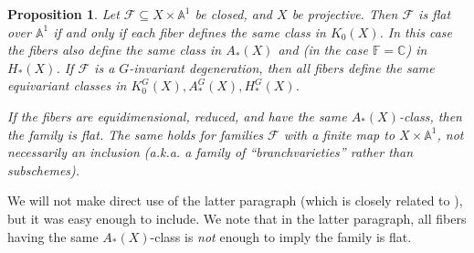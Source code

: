 \documentclass[10pt,a4paper]{amsart}
\newtheorem{proposition}[Thm]{Proposition}
\newcommand{\CC}{\mathbb{C}}
\def\AA{{\mathbb A }}
\newcommand\FF{{\mathbb F}}
\newcommand\calF{{\mathcal F}}
\renewcommand\AA{{\mathbb A}}
\begin{document}
\begin{proposition}\label{prop:flatness}
  Let $\calF \subseteq X \times \AA^1$ be closed, and $X$ be projective.
  Then $\calF$ is flat over $\AA^1$ if and only if each fiber defines
  the same class in $K_0(X)$. In this case the fibers also define the same
  class in $A_*(X)$ and (in the case $\FF=\CC$) in $H_*(X)$.  
  If $\calF$ is a $G$-invariant degeneration, then all fibers define the same equivariant classes in $K^G_0(X),A_*^G(X),H_*^G(X)$.

  If the fibers are equidimensional, reduced, and have the same $A_*(X)$-class, then the family is flat. The same holds for families $\calF$ with a {\em finite map} to
  $X\times\AA^1$, not necessarily an inclusion
  (a.k.a. a family of ``branchvarieties'' \cite{alexeev2010complete}
  rather than subschemes). 
  
\end{proposition}

We will not make direct use of the latter paragraph (which is closely related to \cite[Lemma 1.7.5]{knutson2005grobner}),
but it was easy enough to include. We note that in the latter paragraph, all fibers having the same $A_*(X)$-class is \emph{not} enough to imply the family is flat.
\end{document}
